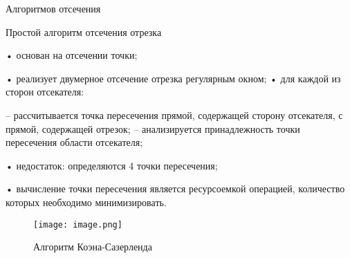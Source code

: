 \documentclass[a4paper, 14pt]{extarticle}
\begin{document}
\begin{center}
\Large {Алгоритмов отсечения} \\ 
\end{center}\normalsize

Простой алгоритм отсечения отрезка

• основан на отсечении точки;

• реализует двумерное отсечение отрезка регулярным окном;
• для каждой из сторон отсекателя:

– рассчитывается точка пересечения прямой, содержащей сторону отсекателя, с прямой,  содержащей отрезок;
– анализируется принадлежность точки пересечения области отсекателя;

• недостаток: определяются 4 точки пересечения;

• вычисление точки пересечения является ресурсоемкой операцией, количество которых необходимо минимизировать.

\begin{figure}
    \centering
    \texttt{[image: image.png]}
    \caption{Алгоритм Коэна-Сазерленда}
    \label{fig:enter-label}
\end{figure}

\pagebreak
\end{document}
